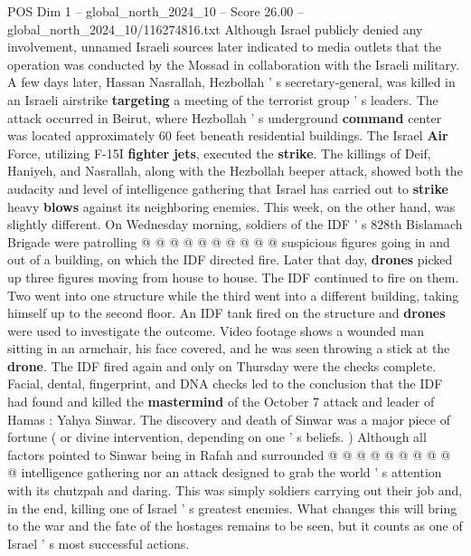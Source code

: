 \begin{textsample}{POS Dim 1 – global\_north\_2024\_10 – Score 26.00 – global\_north\_2024\_10/116274816.txt}
Although Israel publicly denied any involvement, unnamed Israeli sources later indicated to media outlets that the operation was conducted by the Mossad in collaboration with the Israeli military.
A few days later, Hassan Nasrallah, Hezbollah ' s secretary-general, was killed in an Israeli airstrike \textbf{targeting} a meeting of the terrorist group ' s leaders.
The attack occurred in Beirut, where Hezbollah ' s underground \textbf{command} center was located approximately 60 feet beneath residential buildings.
The Israel \textbf{Air} Force, utilizing F-15I \textbf{fighter} \textbf{jets}, executed the \textbf{strike}.
The killings of Deif, Haniyeh, and Nasrallah, along with the Hezbollah beeper attack, showed both the audacity and level of intelligence gathering that Israel has carried out to \textbf{strike} heavy \textbf{blows} against its neighboring enemies.
This week, on the other hand, was slightly different.
On Wednesday morning, soldiers of the IDF ' s 828th Bislamach Brigade were patrolling @ @ @ @ @ @ @ @ @ @ suspicious figures going in and out of a building, on which the IDF directed fire.
Later that day, \textbf{drones} picked up three figures moving from house to house.
The IDF continued to fire on them.
Two went into one structure while the third went into a different building, taking himself up to the second floor.
An IDF tank fired on the structure and \textbf{drones} were used to investigate the outcome.
Video footage shows a wounded man sitting in an armchair, his face covered, and he was seen throwing a stick at the \textbf{drone}.
The IDF fired again and only on Thursday were the checks complete.
Facial, dental, fingerprint, and DNA checks led to the conclusion that the IDF had found and killed the \textbf{mastermind} of the October 7 attack and leader of Hamas : Yahya Sinwar.
The discovery and death of Sinwar was a major piece of fortune ( or divine intervention, depending on one ' s beliefs. ) Although all factors pointed to Sinwar being in Rafah and surrounded @ @ @ @ @ @ @ @ @ @ intelligence gathering nor an attack designed to grab the world ' s attention with its chutzpah and daring.
This was simply soldiers carrying out their job and, in the end, killing one of Israel ' s greatest enemies.
What changes this will bring to the war and the fate of the hostages remains to be seen, but it counts as one of Israel ' s most successful actions.

\end{textsample}
